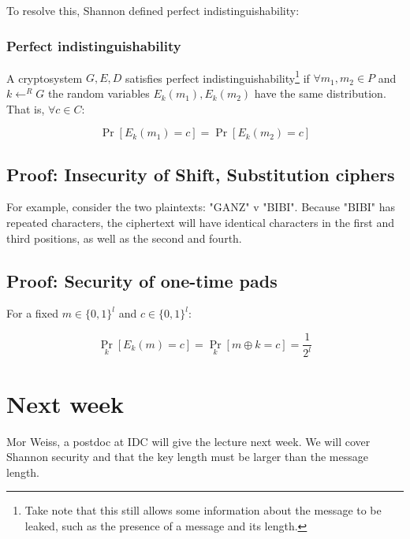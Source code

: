 \documentclass{idc_msc}
\DeclareMathOperator*{\xor}{\oplus}
\begin{document}
To resolve this, Shannon defined perfect indistinguishability:

\subsubsection{Perfect indistinguishability}

A cryptosystem \(G,E,D\) satisfies perfect indistinguishability\footnote{Take note that this still allows some information about the message to be leaked, such as the presence of a message and its length.} if \(\forall m_1, m_2 \in P\) and \(k \gets^R G\) the random variables \(E_k(m_1), E_k(m_2)\) have the same distribution.
That is, \(\forall c \in C\):

\[
  \Pr[E_k(m_1) = c] = \Pr[E_k(m_2) = c]
\]

\subsection{Proof: Insecurity of Shift, Substitution ciphers}

For example, consider the two plaintexts: "GANZ" v "BIBI".
Because "BIBI" has repeated characters, the ciphertext will have identical characters in the first and third positions, as well as the second and fourth.

\subsection{Proof: Security of one-time pads}

For a fixed \(m \in \{0,1\}^l\) and \(c \in \{0,1\}^l\):

\[
  \Pr_k[E_k(m) = c] = \Pr_k[m \xor k = c] = \frac{1}{2^l}
\]

\section{Next week}

Mor Weiss, a postdoc at IDC will give the lecture next week.
We will cover Shannon security and that the key length must be larger than the message length.
\end{document}
